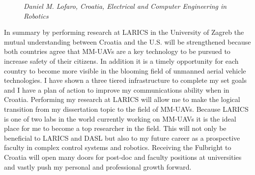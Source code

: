 \documentclass[12pt]{article}
\begin{document}
\begin{figure*}[t]
\caption{\textit{Daniel M. Lofaro, Croatia, Electrical and Computer Engineering in Robotics}}
\end{figure*}



In summary by performing research at LARICS in the University of Zagreb the mutual understanding between Croatia and the U.S. will be strengthened because both countries agree that MM-UAVs are a key technology to be pursued to increase safety of their citizens.
In addition it is a timely opportunity for each country to become more visible in the blooming field of unmanned aerial vehicle technologies.  
I have shown a three tiered infrastructure to complete my set goals and I have a plan of action to improve my communications ability when in Croatia.
Performing my research at LARICS will allow me to make the logical transition from my dissertation topic to the field of MM-UAVs.  
Because LARICS is one of two labs in the world currently working on MM-UAVs it is the ideal place for me to become  a top researcher in the field.  
This will not only be beneficial to LARICS and DASL but also to my future career as a prospective faculty in complex control systems and robotics.
Receiving the Fulbright to Croatia will open many doors for post-doc and faculty positions at universities and vastly push my personal and professional growth forward.
\end{document}
